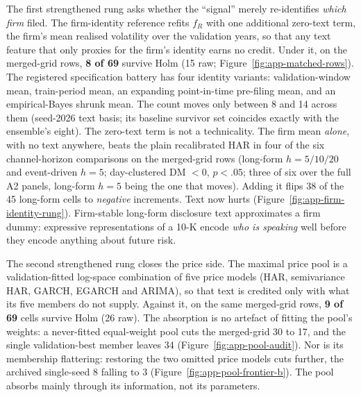 The first strengthened rung asks whether the ``signal'' merely re-identifies \emph{which firm} filed. The firm-identity reference refits $f_R$ with one additional zero-text term, the firm's mean realised volatility over the validation years, so that any text feature that only proxies for the firm's identity earns no credit. Under it, on the merged-grid rows, \textbf{8 of 69} survive Holm (15 raw; Figure~\ref{fig:app-matched-rows}). %
The registered specification battery has four identity variants: validation-window mean, train-period mean, an expanding point-in-time pre-filing mean, and an empirical-Bayes shrunk mean. The count moves only between 8 and 14 across them (seed-2026 text basis; its baseline survivor set coincides exactly with the ensemble's eight). %
The zero-text term is not a technicality. The firm mean \emph{alone}, with no text anywhere, beats the plain recalibrated HAR in four of the six channel-horizon comparisons on the merged-grid rows (long-form $h=5/10/20$ and event-driven $h=5$; day-clustered DM $<0$, $p<.05$; three of six over the full A2 panels, long-form $h=5$ being the one that moves). Adding it flips 38 of the 45 long-form cells to \emph{negative} increments. Text now hurts (Figure~\ref{fig:app-firm-identity-rung}). %
Firm-stable long-form disclosure text approximates a firm dummy: expressive representations of a 10-K encode \emph{who is speaking} well before they encode anything about future risk. %

The second strengthened rung closes the price side. The maximal price pool is a validation-fitted log-space combination of five price models (HAR, semivariance HAR, GARCH, EGARCH and ARIMA), so that text is credited only with what its five members do not supply. Against it, on the same merged-grid rows, \textbf{9 of 69} cells survive Holm (26 raw). %
The absorption is no artefact of fitting the pool's weights: a never-fitted equal-weight pool cuts the merged-grid 30 to 17, and the single validation-best member leaves 34 (Figure~\ref{fig:app-pool-audit}). Nor is its membership flattering: restoring the two omitted price models cuts further, the archived single-seed 8 falling to 3 (Figure~\ref{fig:app-pool-frontier-b}). %
The pool absorbs mainly through its information, not its parameters. %

